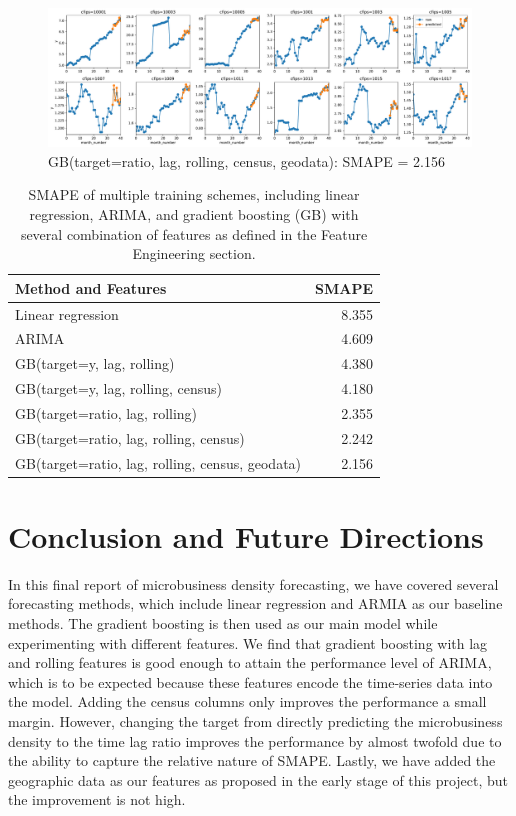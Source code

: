 \documentclass[prl,aps,superscriptaddress,twocolumn,10pt,nolongbibliography]{revtex4-2}
\begin{document}
\begin{figure}
\includegraphics[width=7in]{figs/gb.pdf}
\caption{\label{fig:gb} GB(target=ratio, lag, rolling, census, geodata): SMAPE = 2.156}
\end{figure}

\begin{table}
    \caption{
    SMAPE of multiple training schemes, including linear regression, ARIMA, and gradient boosting (GB) with several combination of features as defined in the Feature Engineering section.
    }
    \label{tab:smape}
    \begin{ruledtabular}
    \begin{tabular}{lr}
    Method and Features & SMAPE \\
    \hline
    Linear regression & 8.355 \\
    ARIMA & 4.609 \\
    GB(target=y, lag, rolling) & 4.380 \\
    GB(target=y, lag, rolling, census) & 4.180 \\
    GB(target=ratio, lag, rolling) & 2.355 \\
    GB(target=ratio, lag, rolling, census) & 2.242 \\
    GB(target=ratio, lag, rolling, census, geodata) & 2.156
\end{tabular}
\end{ruledtabular}
\end{table}

\section{Conclusion and Future Directions}
In this final report of microbusiness density forecasting, we have covered several forecasting methods, which include linear regression and ARMIA as our baseline methods.
The gradient boosting is then used as our main model while experimenting with different features. 
We find that gradient boosting with lag and rolling features is good enough to attain the performance level of ARIMA, which is to be expected because these features encode the time-series data into the model.
Adding the census columns only improves the performance a small margin. 
However, changing the target from directly predicting the microbusiness density to the time lag ratio improves the performance by almost twofold due to the ability to capture the relative nature of SMAPE.
Lastly, we have added the geographic data as our features as proposed in the early stage of this project, but the improvement is not high. 
 
\end{document}
